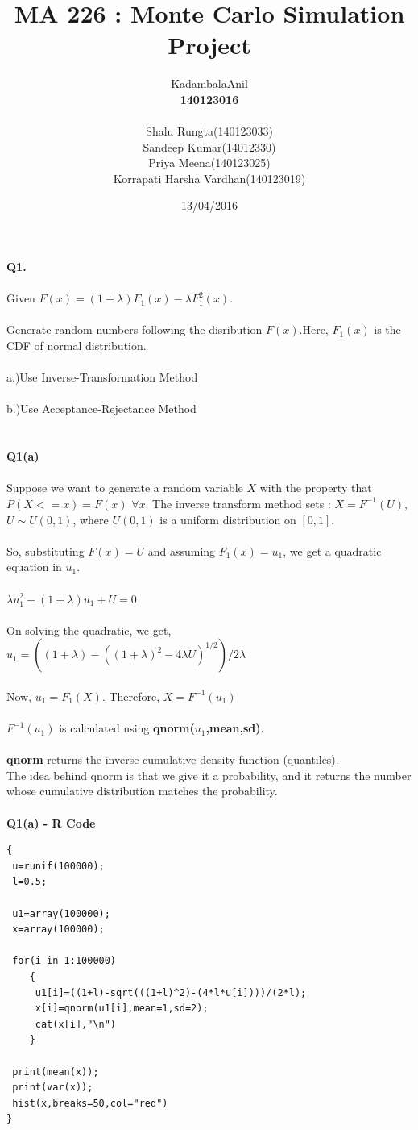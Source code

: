 \documentclass{article}
\title{\LARGE MA 226 : Monte Carlo Simulation\\ \textbf{Project}}
\author{\large KadambalaAnil\\ \textbf{140123016}\\\\Shalu Rungta(140123033)\\Sandeep Kumar(14012330)\\Priya Meena(140123025)\\Korrapati Harsha Vardhan(140123019)}
\date{13/04/2016}
\begin{document}
\maketitle
\textbf{Q1.}\\\\
Given $F(x)=(1+\lambda)F_{1}(x)-\lambda F_{1}^2(x)$.\\\\Generate random numbers following the disribution $F(x)$.Here, $F_{1}(x)$ is the CDF of normal distribution.\\\\a.)Use Inverse-Transformation Method\\\\b.)Use Acceptance-Rejectance Method\\\\\\
\textbf{Q1(a)}\\\\
Suppose we want to generate a random variable $X$ with the property that $P(X<=x)=F(x)$  $\forall x$. The inverse transform method sets : $X=F^{-1}(U)$, $U \sim U(0,1)$, where $U(0,1)$ is a uniform distribution on $[0,1]$.\\\\So, substituting $F(x)=U $ and assuming $F_{1}(x)=u_1$, we get a quadratic equation in $u_1$.\\\\ $\lambda u_1^2-(1+\lambda)u_1+U=0$\\\\On solving the quadratic, we get, $u_1=((1+\lambda)-((1+\lambda)^2-4\lambda U)^{1/2})/2\lambda$\\\\Now, $u_{1}=F_1(X)$. Therefore, $X=F^{-1}(u_1)$\\\\$F^{-1}(u_1)$ is calculated using \textbf{qnorm($u_1$,mean,sd)}.\\\\\textbf{qnorm} returns the inverse cumulative density function (quantiles).\\The idea behind qnorm is that we give it a probability, and it returns the number whose cumulative distribution matches the probability.\\\\ 
\textbf{Q1(a) - R Code}\\
\begin{lstlisting}
{
 u=runif(100000);
 l=0.5;
	
 u1=array(100000);
 x=array(100000);
	
 for(i in 1:100000)
    {
     u1[i]=((1+l)-sqrt(((1+l)^2)-(4*l*u[i])))/(2*l);
     x[i]=qnorm(u1[i],mean=1,sd=2);
     cat(x[i],"\n")
    }
	
 print(mean(x));
 print(var(x));
 hist(x,breaks=50,col="red")
}
\end{lstlisting}
\end{document}
